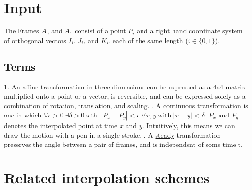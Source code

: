 \documentclass[tikz, journal, letterpaper]{IEEEtran}
\begin{document}
\section{Input}
The Frames $A_0$ and $A_1$ consist of a point $P_i$ and a right hand coordinate system of orthogonal vectors $I_i$, $J_i$, and $K_i$, each of the same length ($i \in \{0,1\}$).
\subsection{Terms} 
1. An \underline{affine} transformation in three dimensions can be expressed as a 4x4 matrix multiplied onto a point or a vector, is reversible, and can be expressed solely as a combination of rotation, translation, and scaling.
. A \underline{continuous} transformation is one in which $\forall \epsilon>0 \; \exists \delta>0 \; \text{s.th.} \; |P_x - P_y|<\epsilon \; \forall x,y \; \text{with} \; |x-y|<\delta$. $P_x$ and $P_y$ denotes the interpolated point at time $x$ and $y$. Intuitively, this means we can draw the motion with a pen in a single stroke.
. A \underline{steady} transformation preserves the angle between a pair of frames, and is independent of some time t. 

\section{Related interpolation schemes}
\end{document}
